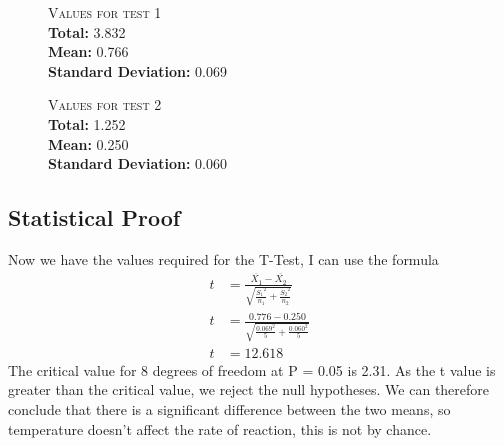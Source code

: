 \documentclass{thomasClass}
\begin{document}
\begin{figure} [H]
    \centering
    \begin{minipage}{0.45\textwidth}
        \textsc{Values for test 1}\\
        \textbf{Total: }3.832\\
        \textbf{Mean: }0.766\\
        \textbf{Standard Deviation: }0.069\\
    \end{minipage}\hfill
    \begin{minipage} {0.45\textwidth}
        \textsc{Values for test 2}\\
        \textbf{Total: }1.252\\
        \textbf{Mean: }0.250\\
        \textbf{Standard Deviation: }0.060\\
    \end{minipage}
\end{figure}

\subsection{Statistical Proof}
Now we have the values required for the T-Test, I can use the formula \\

\begin{align*}
    t&=\frac{\overline{X_1} - \overline{X_2}}{\sqrt{\frac{{S_1}^2}{n_1}+\frac{{S_2}^2}{n_2}}} \\
    t&=\frac{0.776-0.250}{\sqrt{\frac{0.069^2}{5}+\frac{0.060^2}{5}}} \\
    t&=12.618
\end{align*}
The critical value for 8 degrees of freedom at P = 0.05 is 2.31. As the t value is greater than the critical value, we reject the null hypotheses. We can therefore conclude that there is a significant difference between the two means, so temperature doesn't affect the rate of reaction, this is not by chance.
\end{document}
